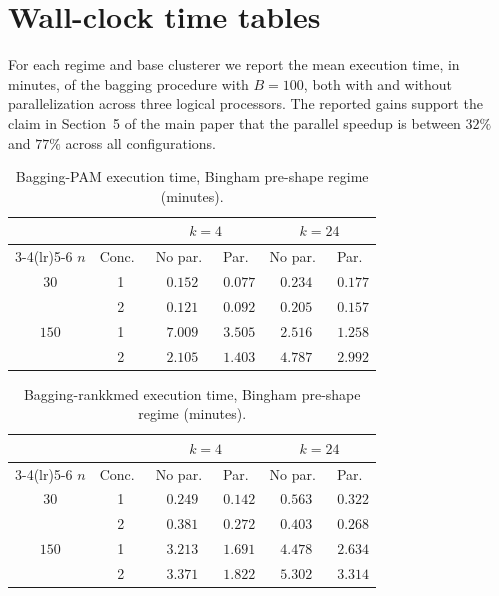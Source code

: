 \documentclass[11pt,a4paper]{article}
\begin{document}
\clearpage


\section{Wall-clock time tables}
\label{sec:time}

For each regime and base clusterer we report the mean execution time, in
minutes, of the bagging procedure with $B=100$, both with and without
parallelization across three logical processors. The reported gains
support the claim in Section~5 of the main paper that the parallel
speedup is between $32\%$ and $77\%$ across all configurations.

\begin{table}[h]
\centering
\caption{Bagging-PAM execution time, Bingham pre-shape regime (minutes).}
\label{tab:time-pam-bing}
\small
\begin{tabular}{cc cc cc}
\toprule
& & \multicolumn{2}{c}{$k=4$} & \multicolumn{2}{c}{$k=24$} \\
\cmidrule(lr){3-4}\cmidrule(lr){5-6}
$n$ & Conc.\ & No par.\ & Par.\ & No par.\ & Par.\ \\
\midrule
$30$  & 1 & $0.152$ & $0.077$ & $0.234$ & $0.177$ \\
      & 2 & $0.121$ & $0.092$ & $0.205$ & $0.157$ \\
$150$ & 1 & $7.009$ & $3.505$ & $2.516$ & $1.258$ \\
      & 2 & $2.105$ & $1.403$ & $4.787$ & $2.992$ \\
\bottomrule
\end{tabular}
\end{table}

\begin{table}[h]
\centering
\caption{Bagging-rankkmed execution time, Bingham pre-shape regime
  (minutes).}
\label{tab:time-rkm-bing}
\small
\begin{tabular}{cc cc cc}
\toprule
& & \multicolumn{2}{c}{$k=4$} & \multicolumn{2}{c}{$k=24$} \\
\cmidrule(lr){3-4}\cmidrule(lr){5-6}
$n$ & Conc.\ & No par.\ & Par.\ & No par.\ & Par.\ \\
\midrule
$30$  & 1 & $0.249$ & $0.142$ & $0.563$ & $0.322$ \\
      & 2 & $0.381$ & $0.272$ & $0.403$ & $0.268$ \\
$150$ & 1 & $3.213$ & $1.691$ & $4.478$ & $2.634$ \\
      & 2 & $3.371$ & $1.822$ & $5.302$ & $3.314$ \\
\bottomrule
\end{tabular}
\end{table}
\end{document}

